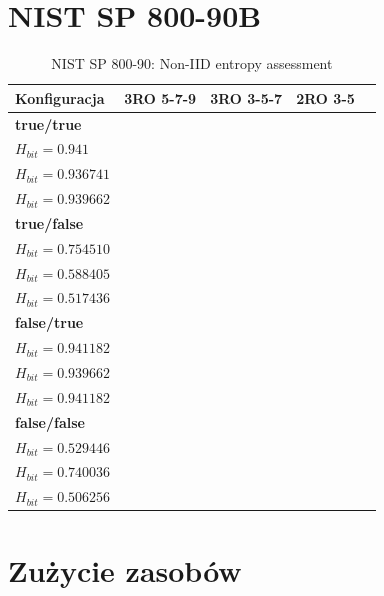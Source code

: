 \section{NIST SP 800-90B}

\begin{table}[H]
\centering
\caption{NIST SP 800-90: Non-IID entropy assessment}
\label{tab:ch3_NIST_SP_800_90}
\begin{tabular}{|l|c|c|c|c|}
\hline
\textbf{Konfiguracja} & \textbf{3RO 5-7-9} & \textbf{3RO 3-5-7} & \textbf{2RO 3-5} \\ \hline

\textbf{true/true} &  
\makecell{$H_{orig}=7.918$ \\ $H_{bit}=0.941$} & 
\makecell{$H_{orig}=7.918681$ \\ $H_{bit}=0.936741$} & 
\makecell{$H_{orig}=7.924784$ \\ $H_{bit}=0.939662$} \\ \hline

\textbf{true/false} &
\makecell{$H_{orig}=6.653213$ \\ $H_{bit}=0.754510$} &
\makecell{$H_{orig}=6.141773$ \\ $H_{bit}=0.588405$} &
\makecell{$H_{orig}=5.917353$ \\ $H_{bit}=0.517436$} \\ \hline

\textbf{false/true} &
\makecell{$H_{orig}=7.915044$ \\ $H_{bit}=0.941182$} &
\makecell{$H_{orig}=7.914641$ \\ $H_{bit}=0.939662$} &
\makecell{$H_{orig}=7.882725$ \\ $H_{bit}=0.941182$} \\ \hline

\textbf{false/false} &
\makecell{$H_{orig}=3.684854$ \\ $H_{bit}=0.529446$} &
\makecell{$H_{orig}=6.703078$ \\ $H_{bit}=0.740036$} &
\makecell{$H_{orig}=6.339803$ \\ $H_{bit}=0.506256$} \\ \hline
\end{tabular}
\end{table}


\section{Zużycie zasobów}

